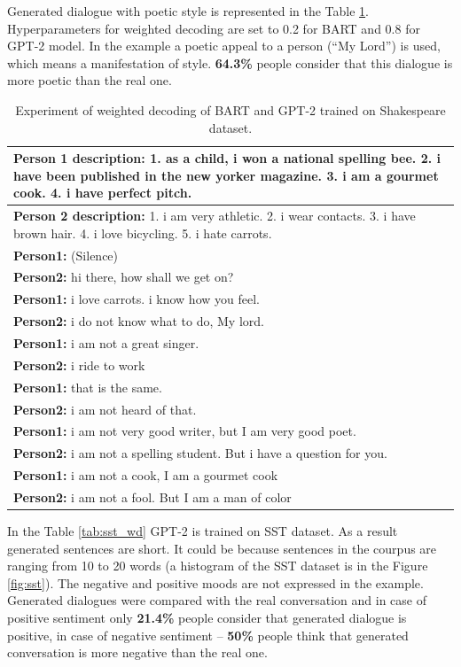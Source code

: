 Generated dialogue with poetic style is represented in the Table \ref{tab:poetic_shakespear}. Hyperparameters for weighted decoding are set to 0.2 for BART and 0.8 for GPT-2 model. In the example a poetic appeal to a person (``My Lord'') is used, which means a manifestation of style. \textbf{64.3\%} people consider that this dialogue is more poetic than the real one.

\begin{table}
\centering
 \begin{tabular}{|p{14cm}|} 
 \hline
 \textbf{Person 1 description:} 1. as a child, i won a national spelling bee. 2. i have been published in the new yorker magazine. 3. i am a gourmet cook. 4. i have perfect pitch. \\
 \hline
 \textbf{Person 2 description:} 1. i am very athletic. 2. i wear contacts. 3. i have brown hair. 4. i love bicycling. 5. i hate carrots. \\
 \hline
 \textbf{Person1:} (Silence) \\
 \textbf{Person2:} hi there, how shall we get on?  \\ 
 \textbf{Person1:} i love carrots. i know how you feel. \\
 \textbf{Person2:} i do not know what to do, My lord. \\
 \textbf{Person1:} i am not a great singer. \\
 \textbf{Person2:} i ride to work \\
 \textbf{Person1:} that is the same. \\
 \textbf{Person2:} i am not heard of that. \\
 \textbf{Person1:} i am not very good writer, but I am very good poet. \\
 \textbf{Person2:} i am not a spelling student. But i have a question for you. \\
 \textbf{Person1:} i am not a cook, I am a gourmet cook \\
 \textbf{Person2:} i am not a fool. But I am a man of color  \\
 \hline
 \end{tabular}
 \caption{Experiment of weighted decoding of BART and GPT-2 trained on Shakespeare dataset.}
\label{tab:poetic_shakespear}
\end{table}

In the Table \ref{tab:sst_wd} GPT-2 is trained on SST dataset. As a result generated sentences are short. It could be because sentences in the courpus are ranging from 10 to 20 words (a histogram of the SST dataset is in the Figure \ref{fig:sst}). The negative and positive moods are not expressed in the example. Generated dialogues were compared with the real conversation and in case of positive sentiment only \textbf{21.4\%} people consider that generated dialogue is positive, in case of negative sentiment -- \textbf{50\%} people think that generated conversation is more negative than the real one. 

